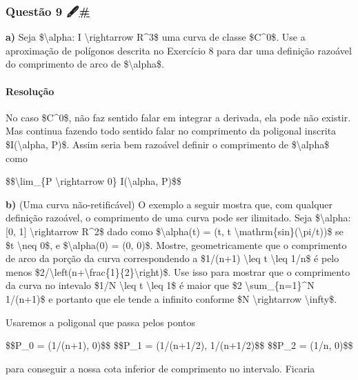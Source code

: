 \hypertarget{questuxe3o-9-}{%
\subsubsection{\texorpdfstring{Questão 9
🖋️\protect\hyperlink{questuxe3o-9-}{\#}}{Questão 9 🖋️\#}}\label{questuxe3o-9-}}

\textbf{a)} Seja \$\textbackslash{}alpha: I \textbackslash{}rightarrow
R\^{}3\$ uma curva de classe \$C\^{}0\$. Use a aproximação de polígonos
descrita no Exercício 8 para dar uma definição razoável do comprimento
de arco de \$\textbackslash{}alpha\$.

\hypertarget{resoluuxe7uxe3o-1}{%
\paragraph{Resolução}\label{resoluuxe7uxe3o-1}}

No caso \$C\^{}0\$, não faz sentido falar em integrar a derivada, ela
pode não existir. Mas continua fazendo todo sentido falar no comprimento
da poligonal inscrita \$I(\textbackslash{}alpha, P)\$. Assim seria bem
razoável definir o comprimento de \$\textbackslash{}alpha\$ como

\$\$\textbackslash{}lim\_\{\textbar{}P\textbar{}
\textbackslash{}rightarrow 0\} I(\textbackslash{}alpha, P)\$\$

\textbf{b)} (Uma curva não-retificável) O exemplo a seguir mostra que,
com qualquer definição razoável, o comprimento de uma curva pode ser
ilimitado. Seja \$\textbackslash{}alpha: {[}0, 1{]}
\textbackslash{}rightarrow R\^{}2\$ dado como \$\textbackslash{}alpha(t)
= (t, t \textbackslash{}mathrm\{sin\}(\textbackslash{}pi/t))\$ se \$t
\textbackslash{}neq 0\$, e \$\textbackslash{}alpha(0) = (0, 0)\$.
Mostre, geometricamente que o comprimento de arco da porção da curva
correspondendo a \$1/(n+1) \textbackslash{}leq t \textbackslash{}leq
1/n\$ é pelo menos
\$2/\textbackslash{}left(n+\textbackslash{}frac\{1\}\{2\}\textbackslash{}right)\$.
Use isso para mostrar que o comprimento da curva no intevalo \$1/N
\textbackslash{}leq t \textbackslash{}leq 1\$ é maior que \$2
\textbackslash{}sum\_\{n=1\}\^{}N 1/(n+1)\$ e portanto que ele tende a
infinito conforme \$N \textbackslash{}rightarrow
\textbackslash{}infty\$.

Usaremos a poligonal que passa pelos pontos

\$\$P\_0 = (1/(n+1), 0)\$\$ \$\$P\_1 = (1/(n+1/2), 1/(n+1/2)\$\$
\$\$P\_2 = (1/n, 0)\$\$

para conseguir a nossa cota inferior de comprimento no intervalo.
Ficaria

